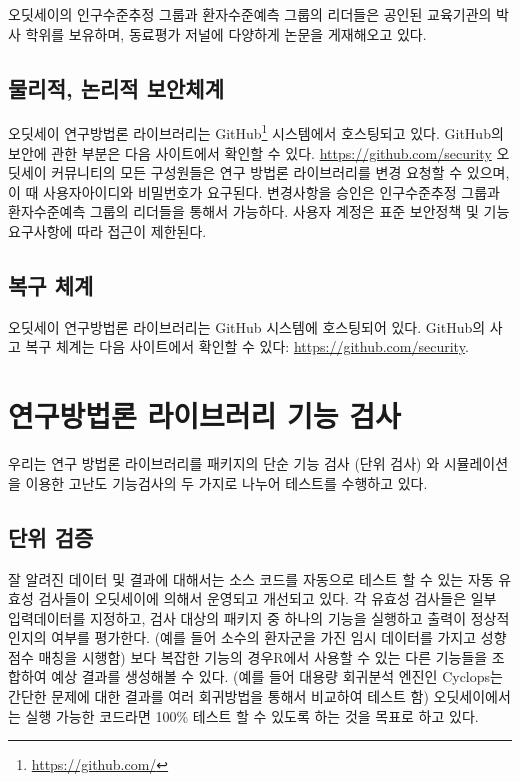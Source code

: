 \documentclass[11pt]{book}
\let\rmarkdownfootnote\footnote%
\def\footnote{\protect\rmarkdownfootnote}
\theoremstyle{definition}
\theoremstyle{definition}
\theoremstyle{definition}
\theoremstyle{remark}
\begin{document}
오딧세이의 인구수준추정 그룹과 환자수준예측 그룹의 리더들은 공인된
교육기관의 박사 학위를 보유하며, 동료평가 저널에 다양하게 논문을
게재해오고 있다.

\subsection{물리적, 논리적 보안체계}\label{--}

오딧세이 연구방법론 라이브러리는 GitHub\footnote{\url{https://github.com/}}
시스템에서 호스팅되고 있다. GitHub의 보안에 관한 부분은 다음 사이트에서
확인할 수 있다. \url{https://github.com/security} 오딧세이 커뮤니티의
모든 구성원들은 연구 방법론 라이브러리를 변경 요청할 수 있으며, 이 때
사용자아이디와 비밀번호가 요구된다. 변경사항을 승인은 인구수준추정
그룹과 환자수준예측 그룹의 리더들을 통해서 가능하다. 사용자 계정은 표준
보안정책 및 기능 요구사항에 따라 접근이 제한된다.

\subsection{복구 체계}\label{-}

오딧세이 연구방법론 라이브러리는 GitHub 시스템에 호스팅되어 있다.
GitHub의 사고 복구 체계는 다음 사이트에서 확인할 수 있다:
\url{https://github.com/security}.

\section{연구방법론 라이브러리 기능 검사}\label{---}

우리는 연구 방법론 라이브러리를 패키지의 단순 기능 검사 (단위 검사) 와
시뮬레이션을 이용한 고난도 기능검사의 두 가지로 나누어 테스트를 수행하고
있다.

\subsection{단위 검증}\label{-}

잘 알려진 데이터 및 결과에 대해서는 소스 코드를 자동으로 테스트 할 수
있는 자동 유효성 검사들이 오딧세이에 의해서 운영되고 개선되고 있다. 각
유효성 검사들은 일부 입력데이터를 지정하고, 검사 대상의 패키지 중 하나의
기능을 실행하고 출력이 정상적인지의 여부를 평가한다. (예를 들어 소수의
환자군을 가진 임시 데이터를 가지고 성향점수 매칭을 시행함) 보다 복잡한
기능의 경우R에서 사용할 수 있는 다른 기능들을 조합하여 예상 결과를
생성해볼 수 있다. (예를 들어 대용량 회귀분석 엔진인 Cyclops는 간단한
문제에 대한 결과를 여러 회귀방법을 통해서 비교하여 테스트 함)
오딧세이에서는 실행 가능한 코드라면 100\% 테스트 할 수 있도록 하는 것을
목표로 하고 있다.
\end{document}
